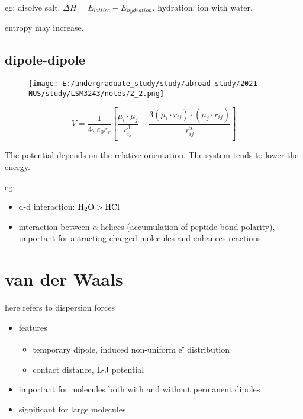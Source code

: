 eg: disolve salt. \(\Delta H=E_{lattice}-E_{hydration}\), hydration: ion
with water.

entropy may increase.

\hypertarget{dipole-dipole}{%
	\subsection{dipole-dipole}\label{dipole-dipole}}

\begin{figure}
	\centering
	\texttt{[image: E:/undergraduate\_study/study/abroad study/2021 NUS/study/LSM3243/notes/2\_2.png]}
\end{figure}

\[V=\dfrac{1}{4\pi\varepsilon_0\varepsilon_r}\left[\dfrac{\mu_i\cdot\mu_j}{r_{ij}^3}-\dfrac{3(\mu_i\cdot r_{ij})\cdot(\mu_j\cdot r_{ij})}{r_{ij}^5}\right]\]

The potential depends on the relative orientation. The system tends to
lower the energy.

eg:

\begin{itemize}
	\item
	d-d interaction: \(\ce{H2O}>\ce{HCl}\)
	\item
	interaction between \(\alpha\) helices (accumulation of peptide bond
	polarity), important for attracting charged molecules and enhances
	reactions.
\end{itemize}

\hypertarget{van-der-waals}{%
	\section{van der Waals}\label{van-der-waals}}

here refers to dispersion forces

\begin{itemize}
	\item
	features
	
	\begin{itemize}
		\item
		temporary dipole, induced non-uniform e\textsuperscript{-}
		distribution
		\item
		contact distance, L-J potential
	\end{itemize}
	\item
	important for molecules both with and without permanent dipoles
	\item
	significant for large molecules
\end{itemize}

